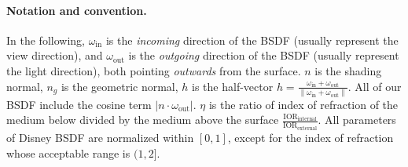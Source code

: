 \paragraph{Notation and convention.} In the following, $\omega_{\text{in}}$ is the \emph{incoming} direction of the BSDF (usually represent the view direction), and $\omega_{\text{out}}$ is the \emph{outgoing} direction of the BSDF (usually represent the light direction), both pointing \emph{outwards} from the surface. $n$ is the shading normal, $n_g$ is the geometric normal, $h$ is the half-vector $h = \frac{\omega_{\text{in}} + \omega_{\text{out}}}{\|\omega_{\text{in}} + \omega_{\text{out}}\|}$. All of our BSDF include the cosine term $|n \cdot \omega_{\text{out}}|$. $\eta$ is the ratio of index of refraction of the medium below divided by the medium above the surface $\frac{\text{IOR}_{\text{internal}}}{\text{IOR}_{\text{external}}}$. All parameters of Disney BSDF are normalized within $[0, 1]$, except for the index of refraction whose acceptable range is $(1, 2]$.

